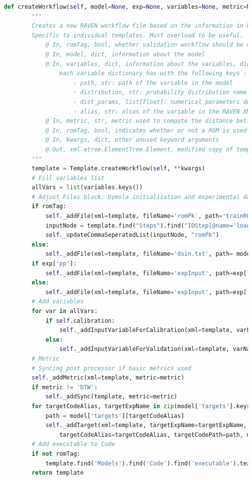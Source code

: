 \documentclass[oneside]{book}
\begin{document}
\begin{lstlisting}[language=Python, caption={Validation Template Class}, label={python:ValidationTemplate}]
    def createWorkflow(self, model=None, exp=None, variables=None, metric=None, romTag=False, **kwargs):
        """
        Creates a new RAVEN workflow file based on the information in kwargs.
        Specific to individual templates. Must overload to be useful.
            @ In, romTag, bool, whether validation workflow should be written for 
            @ In, model, dict, information about the model
            @ In, variables, dict, information about the variables, dictionary of dictionary 
                each variable dictionary has with the following keys : 
                    - path, str: path of the variable in the model 
                    - distribution, str: probability distribution name 
                    - dist_params, list[float]: numerical parameters defining the PDF
                    - alias, str: alias of the variable in the RAVEN XML file
            @ In, metric, str, metric used to compute the distance bet. model and exp data 
            @ In, romTag, bool, indicates whether or not a ROM is used for calibration
            @ In, kwargs, dict, other unused keyword arguments
            @ Out, xml.etree.ElementTree.Element, modified copy of template
        """
        template = Template.createWorkflow(self, **kwargs)
        # Fill variables list
        allVars = list(variables.keys())
        # Adjust Files block: Dymola initialization and experimental data
        if romTag: 
            self._addFile(xml=template, fileName='romPk', path='trainROMWorkDir\\romPk', ftype='')
            inputNode = template.find("Steps").find("IOStep[@name='loadROM']").find('Input')
            self._updateCommaSeperatedList(inputNode, "romPk")
        else:
            self._addFile(xml=template, fileName='dsin.txt', path= model['dymola_ini'], ftype='DymolaInitialisation')
        if exp['pp']:
            self._addFile(xml=template, fileName='expInput', path=exp['clean_dataset'])
        else:
            self._addFile(xml=template, fileName='expInput', path=exp['dataset'])
        # Add variables
        for var in allVars:
            if self.calibration: 
                self._addInputVariableForCalibration(xml=template, varPath=variables[var]['path'], romTag=romTag)
            else:
                self._addInputVariableForValidation(xml=template, varName=var, varDict=variables[var])
        # Metric 
        # Syncing post processor if basic metrics used
        self._addMetric(xml=template, metric=metric)
        if metric != 'DTW':
            self._addSync(template, metric=metric)
        for targetCodeAlias, targetExpName in zip(model['targets'].keys(), exp['targets']): 
            path = model['targets'][targetCodeAlias]
            self._addTarget(xml=template, targetExpName=targetExpName, 
                targetCodeAlias=targetCodeAlias, targetCodePath=path, metric=metric, romTag=romTag)
        # Add executable to Code
        if not romTag:
            template.find('Models').find('Code').find('executable').text = model['dymola_exe']
        return template
\end{lstlisting}

\medskip
\printbibliography
\end{document}
